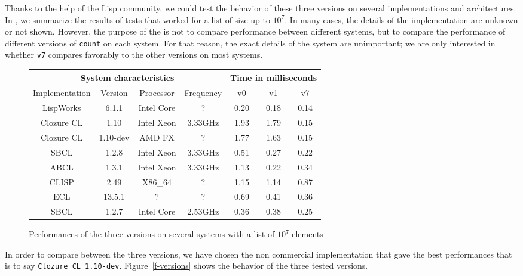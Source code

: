 
Thanks to the help of the Lisp community, we could test the behavior
of these three versions on several implementations and architectures.
In , we summarize the results of tests that worked
for a list of size up to $10^7$.  In many cases, the details of the
implementation are unknown or not shown.  However, the purpose of the
 is not to compare performance between different
systems, but to compare the performance of different versions of
\texttt{count} on each system.  For that reason, the exact details of
the system are unimportant; we are only interested in whether
\texttt{v7} compares favorably to the other versions on most systems.

\begin{figure}[htb]
\centering
\begin{tabular}{|c|c|c|c|c|c|c|}
\hline
\multicolumn{4}{|c|}{System characteristics}  & \multicolumn{3}{|c|}{Time in milliseconds}\\ \hline
Implementation & Version      & Processor                  & Frequency          & v0 & v1 & v7 \\ \hline
LispWorks  & 6.1.1            & Intel Core &  ?                 & 0.20 & 0.18 & 0.14 \\ \hline
Clozure CL & 1.10     & Intel Xeon & 3.33GHz            & 1.93 & 1.79 & 0.15 \\ \hline
Clozure CL & 1.10-dev & AMD FX & ? & 1.77 & 1.63 & 0.15 \\ \hline
SBCL       & 1.2.8 & Intel Xeon & 3.33GHz            & 0.51 & 0.27 & 0.22 \\ \hline
ABCL       & 1.3.1            & Intel Xeon & 3.33GHz            & 1.13 & 0.22 & 0.34 \\ \hline
CLISP      & 2.49             & X86\_64                    &   ?                & 1.15 & 1.14 & 0.87 \\ \hline
ECL        & 13.5.1           & ?                          &   ?                & 0.69 & 0.41 & 0.36 \\ \hline
SBCL       & 1.2.7 & Intel Core & 2.53GHz      & 0.36 & 0.38 & 0.25 \\ \hline
\end{tabular}
\caption{\label{f-systems} Performances of the three versions on several systems with a list of $10^7$ elements}
\end{figure}

In order to compare between the three versions, we have chosen the non commercial implementation
that gave the best performances that is to say \texttt{Clozure CL 1.10-dev}.
Figure~\ref{f-versions} shows the behavior of the three tested versions.

